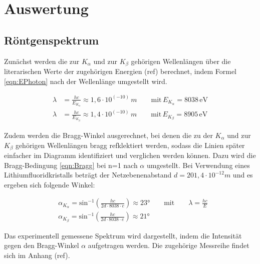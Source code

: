 \documentclass[titlepage = firstcover]{scrartcl}
\begin{document}
    \newpage
    \section{Auswertung}
        \subsection{Röntgenspektrum}
        Zunächst werden die zur $K_{\alpha}$ und zur $K_{\beta}$ gehörigen Wellenlängen über die literarischen Werte der zugehörigen Energien (ref) 
        berechnet, indem Formel \ref{eqn:EPhoton} nach der Wellenlänge umgestellt wird.

        \begin{align}
            \lambda &= \frac{hc}{E_{K_{\alpha}}} \approx 1,6 \cdot 10^{\left(-10\right)}\,m \qquad \text{mit} \, E_{K_{\alpha}}=8038 \, \text{eV} \\
            \lambda &= \frac{hc}{E_{K_{\beta}}} \approx 1,4 \cdot 10^{\left(-10\right)}\,m \qquad \text{mit} \, E_{K_{\beta}}=8905 \, \text{eV}
        \end{align}

        \noindent
        Zudem werden die Bragg-Winkel ausgerechnet, bei denen die zu der $K_{\alpha}$ und zur $K_{\beta}$ gehörigen Wellenlängen bragg refklektiert werden, 
        sodass die Linien später einfacher im Diagramm identifiziert und verglichen werden können. Dazu wird die Bragg-Bedingung \ref{eqn:Bragg} bei n=1 
        nach $\alpha$ umgestellt. Bei Verwendung eines Lithiumfluoridkristalls beträgt der Netzebenenabstand $d=201,4 \cdot 10^{-12}m$ und es ergeben sich
        folgende Winkel:

        \begin{align}
            &\alpha_{K_{\alpha}} = \text{sin}^{-1}\left(\frac{hc}{2d \cdot 8038\cdot e }\right) \approx 23° \qquad \text{mit} \qquad \lambda = \frac{hc}{E} \\
            &\alpha_{K_{\beta}}  = \text{sin}^{-1}\left(\frac{hc}{2d \cdot 8038\cdot e }\right) \approx 21°
        \end{align}

        \noindent
        Das experimentell gemessene Spektrum wird dargestellt, indem die Intensität gegen den Bragg-Winkel $\alpha$ aufgetragen werden. Die zugehörige 
        Messreihe findet sich im Anhang (ref).
        
\end{document}
